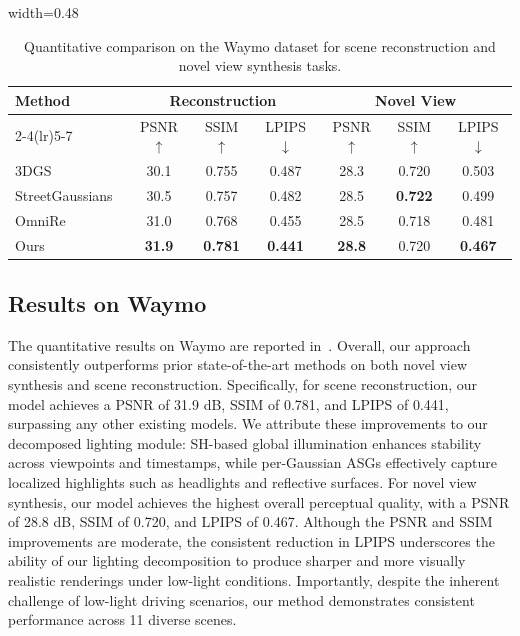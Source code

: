 \documentclass[letterpaper, 10 pt, conference]{ieeeconf}  %
\newcommand{\best}[1]{\cellcolor{best}\textbf{#1}}
\newcommand{\second}[1]{\cellcolor{second}#1}
\begin{document}
\begin{table}[t]
\caption{Quantitative comparison on the Waymo dataset for scene reconstruction and novel view synthesis tasks.}
\label{tab:waymo}
\centering
\scriptsize
\setlength{\tabcolsep}{4pt}
\renewcommand{\arraystretch}{1.12}
\begin{adjustbox}{width=0.48\textwidth} %
\begin{tabular}{lccc ccc}
\toprule
\multirow{2}{*}{Method} &
\multicolumn{3}{c}{Reconstruction} &
\multicolumn{3}{c}{Novel View} \\
\cmidrule(lr){2-4}\cmidrule(lr){5-7}
& PSNR$\uparrow$ & SSIM$\uparrow$ & LPIPS$\downarrow$
& PSNR$\uparrow$ & SSIM$\uparrow$ & LPIPS$\downarrow$ \\
\midrule
3DGS~\cite{kerbl20233d} 
& 30.1 & 0.755 & 0.487
& 28.3 & 0.720 & 0.503 \\

StreetGaussians~\cite{yan2024street} 
& 30.5 & 0.757 & 0.482
& 28.5 & \best{0.722} & 0.499 \\

OmniRe~\cite{chen2025omnire}
& \second{31.0} & \second{0.768} & \second{0.455}
& 28.5 & 0.718 & \second{0.481} \\

Ours          
& \best{31.9} & \best{0.781} & \best{0.441}
& \best{28.8} & \second{0.720} & \best{0.467} \\
\bottomrule
\end{tabular}
\end{adjustbox}
\end{table}


\subsection{Results on Waymo}
The quantitative results on Waymo are reported in~.
Overall, our approach consistently outperforms prior state-of-the-art methods on both novel view synthesis and scene reconstruction. 
%
Specifically, for scene reconstruction, our model achieves a PSNR of 31.9 dB, SSIM of 0.781, and LPIPS of 0.441, surpassing any other existing models. We attribute these improvements to our decomposed lighting module: SH-based global illumination enhances stability across viewpoints and timestamps, while per-Gaussian ASGs effectively capture localized highlights such as headlights and reflective surfaces.
%
For novel view synthesis, our model achieves the highest overall perceptual quality, with a PSNR of 28.8 dB, SSIM of 0.720, and LPIPS of 0.467. Although the PSNR and SSIM improvements are moderate, the consistent reduction in LPIPS underscores the ability of our lighting decomposition to produce sharper and more visually realistic renderings under low-light conditions. Importantly, despite the inherent challenge of low-light driving scenarios, our method demonstrates consistent performance across 11 diverse scenes.
\end{document}
